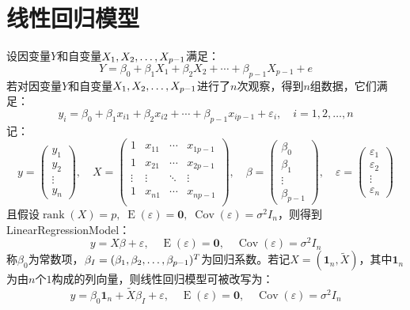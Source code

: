 \section{线性回归模型}
\begin{definition}\label{model:LinearRegressionModel}
	设因变量$Y$和自变量$X_1, X_2, \dots, X_{p-1}$满足：
	\begin{equation*}
		Y=\beta_0+\beta_1X_1+\beta_2X_2+\cdots+\beta_{p-1}X_{p-1}+e
	\end{equation*}
	若对因变量$Y$和自变量$X_1, X_2, \dots, X_{p-1}$进行了$n$次观察，得到$n$组数据，它们满足：
	\begin{equation*}
		y_i=\beta_0+\beta_1x_{i1}+\beta_2x_{i2}+\cdots+\beta_{p-1}x_{ip-1}+\varepsilon_i,\quad i=1,2,\dots,n
	\end{equation*}
	记：
	\begin{equation*}
		y=
		\begin{pmatrix}
			y_1 \\
			y_2 \\
			\vdots \\
			y_n
		\end{pmatrix},\quad
		X=
		\begin{pmatrix}
			1 & x_{11} & \cdots & x_{1p-1} \\
			1 & x_{21} & \cdots & x_{2p-1} \\
			\vdots & \vdots & \ddots & \vdots \\
			1 & x_{n1} & \cdots & x_{np-1} \\
		\end{pmatrix},\quad
		\beta=
		\begin{pmatrix}
			\beta_0 \\
			\beta_1 \\
			\vdots \\
			\beta_{p-1}
		\end{pmatrix},\quad
		\varepsilon=
		\begin{pmatrix}
			\varepsilon_1 \\
			\varepsilon_2 \\
			\vdots \\
			\varepsilon_n
		\end{pmatrix}
	\end{equation*}
	且假设$\operatorname{rank}(X)=p,\;\operatorname{E}(\varepsilon)=\mathbf{0},\;\operatorname{Cov}(\varepsilon)=\sigma^2I_n$，则得到\gls{LinearRegressionModel}：
	\begin{equation*}
		y=X\beta+\varepsilon,\quad\operatorname{E}(\varepsilon)=\mathbf{0},\quad\operatorname{Cov}(\varepsilon)=\sigma^2I_n
	\end{equation*}
	称$\beta_0$为常数项，$\beta_I=(\beta_1, \beta_2, \dots, \beta_{p-1})^T$为回归系数。若记$X=(\mathbf{1}_n,\tilde{X})$，其中$\mathbf{1}_n$为由$n$个$1$构成的列向量，则线性回归模型可被改写为：
	\begin{equation*}
		y=\beta_0\mathbf{1}_n+\tilde{X}\beta_I+\varepsilon,\quad\operatorname{E}(\varepsilon)=\mathbf{0},\quad\operatorname{Cov}(\varepsilon)=\sigma^2I_n
	\end{equation*}
\end{definition}
